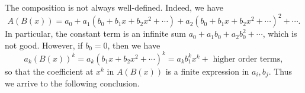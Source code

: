 

\setcounter{section}{2}
\setcounter{subsection}{2}
\setcounter{dfn}{5}

The composition is not always well-defined. Indeed, we have
\[
A(B(x)) = a_0 + a_1(b_0 + b_1 x + b_2 x^2 + \cdots) + a_2(b_0 + b_1 x + b_2 x^2 + \cdots)^2 + \cdots.
\]
In particular, the constant term is an infinite sum $a_0 + a_1 b_0 + a_2 b_0^2 + \cdots$, which is not good.
However, if $b_0 = 0$, then we have
\[
a_k (B(x))^k = a_k (b_1 x + b_2 x^2 + \cdots)^k = a_k b_1^k x^k + \text{ higher order terms},
\]
so that the coefficient at $x^k$ in $A(B(x))$ is a finite expression in $a_i, b_j$.
Thus we arrive to the following conclusion.


